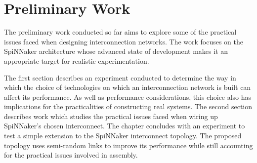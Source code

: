 \chapter{Preliminary Work}
	
	
	The preliminary work conducted so far aims to explore some of the practical
	issues faced when designing interconnection networks. The work focuses on the
	SpiNNaker architecture whose advanced state of development makes it an
	appropriate target for realistic experimentation.
	
	The first section describes an experiment conducted to determine the way in
	which the choice of technologies on which an interconnection network is built
	can affect its performance. As well as performance considerations, this choice
	also has implications for the practicalities of constructing real systems. The
	second section describes work which studies the practical issues faced when
	wiring up SpiNNaker's chosen interconnect. The chapter concludes with an
	experiment to test a simple extension to the SpiNNaker interconnect topology.
	The proposed topology uses semi-random links to improve its performance while
	still accounting for the practical issues involved in assembly.
	
	

